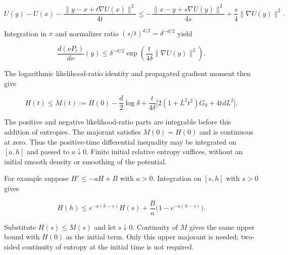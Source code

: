 \documentclass[11pt,a4paper]{article}
\begin{document}
\[U(y)-U(x)-\frac{\|y-x+t\nabla U(x)\|^2}{4t}
\le-\frac{\|x-y+s\nabla U(y)\|^2}{4s}
+\frac s4\|\nabla U(y)\|^2.\]

Integration in \(x\) and normalizer ratio \((s/t)^{d/2}=\delta^{-d/2}\) yield

\[\frac{d(\nu P_t)}{d\nu}(y)\le\delta^{-d/2}
\exp\!\left(\frac t{4\delta}\|\nabla U(y)\|^2\right).\]

The logarithmic likelihood-ratio identity and propagated gradient moment then give

\[H(t)\le M(t):=H(0)-\frac d2\log\delta
+\frac t{4\delta}\bigl[2(1+L^2t^2)G_0+4tdL^2\bigr].\]

The positive and negative likelihood-ratio parts are integrable before this addition of entropies. The majorant satisfies \(M(0)=H(0)\) and is continuous at zero. Thus the positive-time differential inequality may be integrated on \([a,h]\) and passed to \(a\downarrow0\). Finite initial relative entropy suffices, without an initial smooth density or smoothing of the potential.



For example suppose \(H'\le-aH+B\) with \(a>0\). Integration on \([s,h]\) with \(s>0\) gives

\[H(h)\le e^{-a(h-s)}H(s)+\frac Ba\bigl(1-e^{-a(h-s)}\bigr).\]

Substitute \(H(s)\le M(s)\) and let \(s\downarrow0\). Continuity of \(M\) gives the same upper bound with \(H(0)\) as the initial term. Only this upper majorant is needed; two-sided continuity of entropy at the initial time is not required.
\end{document}
